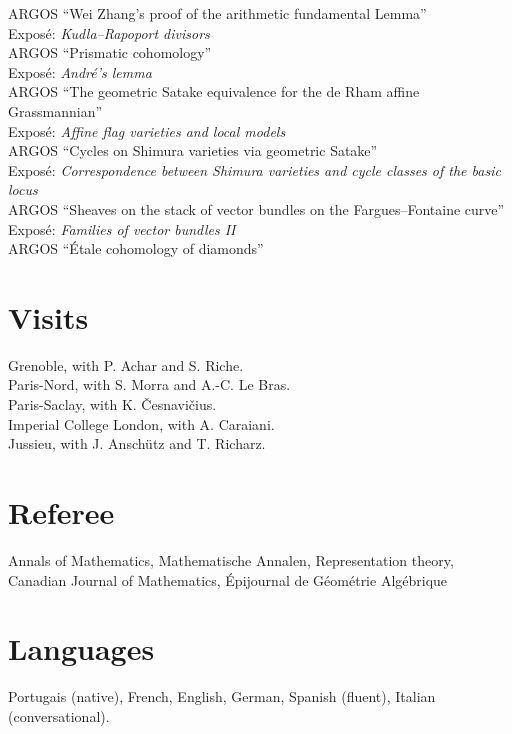 \documentclass[12pt]{article} %
\begin{document}
 ARGOS ``Wei Zhang's proof of the arithmetic fundamental Lemma''\\
Exposé: {\it Kudla--Rapoport divisors} \\

 ARGOS ``Prismatic cohomology''\\
Exposé: {\it André's lemma} \\

 ARGOS ``The geometric Satake equivalence for the de Rham affine Grassmannian''\\
Exposé: {\it Affine flag varieties and local models} \\

 ARGOS ``Cycles on Shimura varieties via geometric Satake''\\
Exposé: {\it Correspondence between Shimura varieties and cycle classes of the basic locus} \\

 ARGOS ``Sheaves on the stack of vector bundles on the Fargues--Fontaine curve''\\
Exposé: {\it Families of vector bundles II}\\

 ARGOS ``Étale cohomology of diamonds''
\fi

\section*{Visits}
Grenoble, with P. Achar and S. Riche.\\

 Paris-Nord, with S. Morra and A.-C. Le Bras. \\

 Paris-Saclay, with K. \v{C}esnavi\v{c}ius. \\

 Imperial College London, with A. Caraiani.\\

 Jussieu, with J. Anschütz and T. Richarz.
\section*{Referee}
Annals of Mathematics, Mathematische Annalen, Representation theory, Canadian Journal of Mathematics, Épijournal de Géométrie Algébrique

\section*{Languages}
Portugais (native), French, English, German, Spanish (fluent), Italian (conversational).
\end{document}
